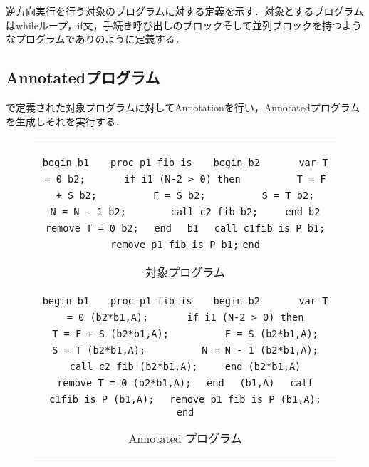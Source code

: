 \documentclass[submit,PRO]{ipsj}
\def\|{\verb|}
\begin{document}
逆方向実行を行う対象のプログラムに対する定義を示す．対象とするプログラムはwhileループ，if文，手続き呼び出しのブロックそして並列ブロックを持つようなプログラムでありのように定義する．



\subsection{Annotatedプログラム}

で定義された対象プログラムに対してAnnotationを行い，Annotatedプログラムを生成しそれを実行する．

\begin{figure}[tb]
\begin{center}
\begin{tabular}{c}
\begin{minipage}[t]{0.5\columnwidth}
\footnotesize
\setbox0\vbox{
\hbox{\|begin b1|}
\hbox{\|   proc p1 fib is|}
\hbox{\|   begin b2|}
\hbox{\|      var T = 0 b2;|}
\hbox{\|      if i1 (N-2 > 0) then|}
\hbox{\|         T = F + S b2;|}
\hbox{\|         F = S b2;|}
\hbox{\|         S = T b2;|}
\hbox{\|         N = N - 1 b2;|}
\hbox{\|       call c2 fib b2;|}
\hbox{\|    end b2|}
\hbox{\|    remove T = 0 b2;|}
\hbox{\|  end|}
\hbox{\|  b1|}
\hbox{\|  call c1fib is P b1;|}
\hbox{\|  remove p1 fib is P b1;|}
\hbox{\|end|}
}
\centerline{\fbox{\box0}}
\caption{対象プログラム}
\ecaption{Original Program}
\label{fig:Horiginal}
\end{minipage}

\begin{minipage}[t]{0.5\columnwidth}
\footnotesize
\setbox0\vbox{
\hbox{\|begin b1|}
\hbox{\|   proc p1 fib is|}
\hbox{\|   begin b2|}
\hbox{\|      var T = 0 (b2*b1,A);|}
\hbox{\|      if i1 (N-2 > 0) then|}
\hbox{\|         T = F + S (b2*b1,A);|}
\hbox{\|         F = S (b2*b1,A);|}
\hbox{\|         S = T (b2*b1,A);|}
\hbox{\|         N = N - 1 (b2*b1,A);|}
\hbox{\|       call c2 fib (b2*b1,A);|}
\hbox{\|    end (b2*b1,A)|}
\hbox{\|    remove T = 0 (b2*b1,A);|}
\hbox{\|  end|}
\hbox{\|  (b1,A)|}
\hbox{\|  call c1fib is P (b1,A);|}
\hbox{\|  remove p1 fib is P (b1,A);|}
\hbox{\|end|}
}
\centerline{\fbox{\box0}}
\caption{Annotated プログラム}
\ecaption{Annotated Program}
\label{fig:Hannotated}
\end{minipage}
\end{tabular}
\end{center}
\end{figure}
\end{document}
